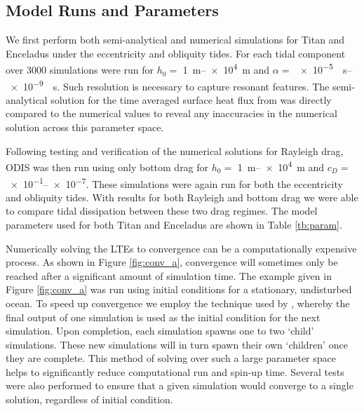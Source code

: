\subsection{Model Runs and Parameters \label{subsec:param}}



We first perform both semi-analytical and numerical simulations for Titan and Enceladus under the eccentricity and obliquity tides. For each tidal component over 3000 simulations were run for $h_0 = $ \SIrange{1}{e4}{\metre} and $\alpha = $ \SIrange{e-5}{e-9}{\per\second}. Such resolution is necessary to capture resonant features. The semi-analytical solution for the time averaged surface heat flux from \citet{matsuyama2014tidal} was directly compared to the numerical values to reveal any inaccuracies in the numerical solution across this parameter space. 

Following testing and verification of the numerical solutions for Rayleigh drag, ODIS was then run using only bottom drag for $h_0 = $ \SIrange{1}{e4}{\metre} and $c_D = $ \numrange{e-1}{e-7}. These simulations were again run for both the eccentricity and obliquity tides. With results for both Rayleigh and bottom drag we were able to compare tidal dissipation between these two drag regimes. The model parameters used for both Titan and Enceladus are shown in Table \ref{tb:param}.

Numerically solving the LTEs to convergence can be a computationally expensive process. As shown in Figure \ref{fig:conv_a}, convergence will sometimes only be reached after a significant amount of simulation time. The example given in Figure \ref{fig:conv_a} was run using initial conditions for a stationary, undisturbed ocean. To speed up convergence we employ the technique used by \citet{sears1995tidal}, whereby the final output of one simulation is used as the initial condition for the next simulation. Upon completion, each simulation spawns one to two `child' simulations. These new simulations will in turn spawn their own `children' once they are complete. This method of solving over such a large parameter space helps to significantly reduce computational run and spin-up time. Several tests were also performed to ensure that a given simulation would converge to a single solution, regardless of initial condition.



